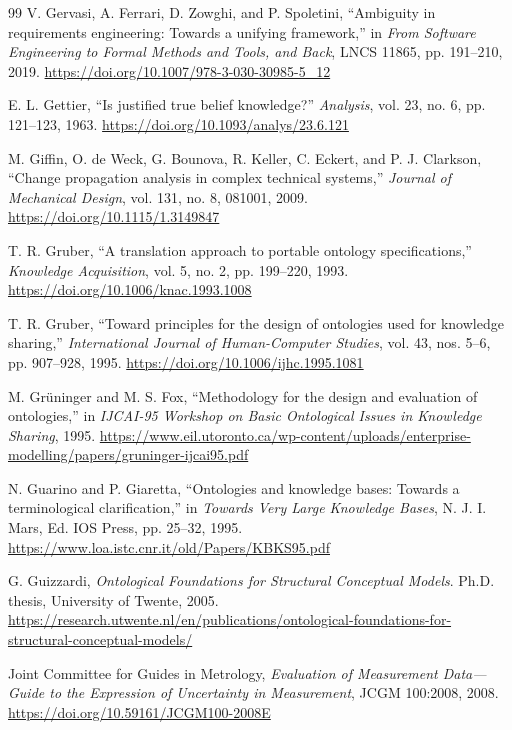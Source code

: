 \documentclass[10pt,a4paper]{article}
\begin{document}
\begin{thebibliography}{99}
V. Gervasi, A. Ferrari, D. Zowghi, and P. Spoletini, ``Ambiguity in requirements engineering: Towards a unifying framework,'' in \emph{From Software Engineering to Formal Methods and Tools, and Back}, LNCS 11865, pp. 191--210, 2019. \url{https://doi.org/10.1007/978-3-030-30985-5_12}

E. L. Gettier, ``Is justified true belief knowledge?'' \emph{Analysis}, vol. 23, no. 6, pp. 121--123, 1963. \url{https://doi.org/10.1093/analys/23.6.121}

M. Giffin, O. de Weck, G. Bounova, R. Keller, C. Eckert, and P. J. Clarkson, ``Change propagation analysis in complex technical systems,'' \emph{Journal of Mechanical Design}, vol. 131, no. 8, 081001, 2009. \url{https://doi.org/10.1115/1.3149847}

T. R. Gruber, ``A translation approach to portable ontology specifications,'' \emph{Knowledge Acquisition}, vol. 5, no. 2, pp. 199--220, 1993. \url{https://doi.org/10.1006/knac.1993.1008}

T. R. Gruber, ``Toward principles for the design of ontologies used for knowledge sharing,'' \emph{International Journal of Human-Computer Studies}, vol. 43, nos. 5--6, pp. 907--928, 1995. \url{https://doi.org/10.1006/ijhc.1995.1081}

M. Gr\"uninger and M. S. Fox, ``Methodology for the design and evaluation of ontologies,'' in \emph{IJCAI-95 Workshop on Basic Ontological Issues in Knowledge Sharing}, 1995. \url{https://www.eil.utoronto.ca/wp-content/uploads/enterprise-modelling/papers/gruninger-ijcai95.pdf}

N. Guarino and P. Giaretta, ``Ontologies and knowledge bases: Towards a terminological clarification,'' in \emph{Towards Very Large Knowledge Bases}, N. J. I. Mars, Ed. IOS Press, pp. 25--32, 1995. \url{https://www.loa.istc.cnr.it/old/Papers/KBKS95.pdf}

G. Guizzardi, \emph{Ontological Foundations for Structural Conceptual Models}. Ph.D. thesis, University of Twente, 2005. \url{https://research.utwente.nl/en/publications/ontological-foundations-for-structural-conceptual-models/}

Joint Committee for Guides in Metrology, \emph{Evaluation of Measurement Data---Guide to the Expression of Uncertainty in Measurement}, JCGM 100:2008, 2008. \url{https://doi.org/10.59161/JCGM100-2008E}


\end{thebibliography}
\end{document}
